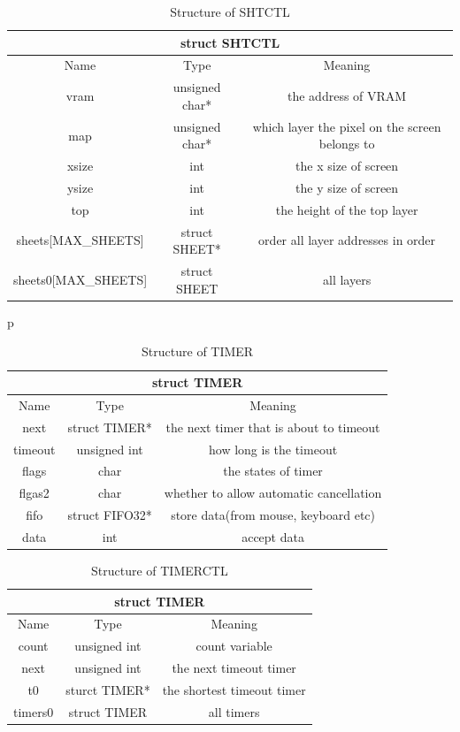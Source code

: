 \documentclass{swfcthesis}
\begin{document}
\begin{table}[!htbp]
  \centering
  \begin{tabular}{|c|c|c|}
    \hline
    \multicolumn{3}{|c|}{struct SHTCTL} \\
    \hline
    Name & Type & Meaning \\
    \hline
    vram & unsigned char* & the address of VRAM \\
    \hline
    map & unsigned char* & which layer the pixel on the screen belongs to \\
    \hline
    xsize & int & the x size of screen \\
    \hline
    ysize & int & the y size of screen \\
    \hline
    top & int & the height of the top layer \\
    \hline
    sheets[MAX\_SHEETS] & struct SHEET* & order all layer addresses in order \\
    \hline
    sheets0[MAX\_SHEETS] & struct SHEET & all layers \\
    \hline
  \end{tabular}
  \caption{Structure of SHTCTL}
  \label{tab:SHTCTL}p
\end{table}

\begin{table}[!htbp]
  \centering
  \begin{tabular}{|c|c|c|}
    \hline
    \multicolumn{3}{|c|}{struct TIMER} \\
    \hline
    Name & Type & Meaning \\
    \hline
    next & struct TIMER* & the next timer that is about to timeout \\
    \hline
    timeout & unsigned int & how long is the timeout \\
    \hline
    flags & char & the states of timer \\
    \hline
    flgas2 & char & whether to allow automatic cancellation \\
    \hline
    fifo & struct FIFO32* & store data(from mouse, keyboard etc) \\
    \hline
    data & int & accept data \\
    \hline
  \end{tabular}
  \caption{Structure of TIMER}
  \label{tab:TIMER}
\end{table}

\begin{table}[!htbp]
  \centering
  \begin{tabular}{|c|c|c|}
    \hline
    \multicolumn{3}{|c|}{struct TIMER} \\
    \hline
    Name & Type & Meaning \\
    \hline
    count & unsigned int & count variable \\
    \hline
    next & unsigned int & the next timeout timer \\
    \hline
    t0 & sturct TIMER* & the shortest timeout timer \\
    \hline
    timers0 & struct TIMER & all timers \\
    \hline
  \end{tabular}
  \caption{Structure of TIMERCTL}
  \label{tab:TIMERCTL}
\end{table}
\end{document}
